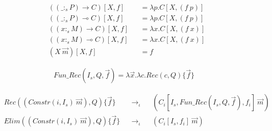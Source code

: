 \message{ !name(scratch.tex)}\documentclass{article}
\begin{document}
\begin{align*}
  & ((\_ :_s P) \rightarrow C)[X,f] && = \lambda p.C[X,(f\ p)] \\
  & ((\_ :_s P) \multimap C)[X,f] && = \lambda p.C[X,(f\ p)] \\
  & ((x :_s M) \rightarrow C)[X,f] && = \lambda x.C[X,(f\ x)] \\
  & ((x :_s M) \multimap C)[X,f] && = \lambda x.C[X,(f\ x)] \\
  & (X\ \overrightarrow{m})[X,f] && = f
\end{align*}

\begin{align*}
  Fun\_Rec(I_s,Q,\overrightarrow{f}) = \lambda \overrightarrow{x}. \lambda c.Rec(c,Q)\{\overrightarrow{f}\}
\end{align*}

\begin{align*}
  & Rec((Constr(i, I_s)\ \overrightarrow{m}), Q)\{\overrightarrow{f}\} && \rightarrow_\iota && (C_i[I_s,Fun\_Rec(I_s,Q,\overrightarrow{f}),f_i]\ \overrightarrow{m}) \\
  & Elim((Constr(i, I_s)\ \overrightarrow{m}), Q)\{\overrightarrow{f}\} && \rightarrow_\iota && (C_i[I_s,f_i]\ \overrightarrow{m})
\end{align*}
\end{document}
